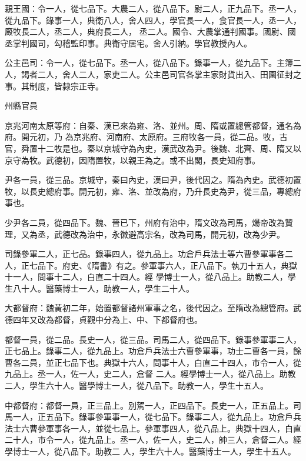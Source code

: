 \begin{pinyinscope}
 親王國：令一人，從七品下。大農二人，從八品下。尉二人，正九品下。丞一人，從九品下。錄事一人，典衛八人，舍人四人，學官長一人，食官長一人，丞一人，廄牧長二人，丞二人，典府長二人，
 丞二人。國令、大農掌通判國事。國尉、國丞掌判國司，勾稽監印事。典衛守居宅。舍人引納。學官教授內人。



 公主邑司：令一人，從七品下。丞一人，從八品下。錄事一人，從九品下。主簿二人，謁者二人，舍人二人，家吏二人。公主邑司官各掌主家財貨出入、田園征封之事。其制度，皆隸宗正寺。



 州縣官員



 京兆河南太原等府：自秦、漢已來為雍、洛、並州。周、隋或置總管都督，通名為府。開元初，乃
 為京兆府、河南府、太原府。三府牧各一員，從二品。牧，古官，舜置十二牧是也。秦以京城守為內史，漢武改為尹。後魏、北齊、周、隋又以京守為牧。武德初，因隋置牧，以親王為之。或不出閣，長史知府事。



 尹各一員，從三品。京城守，秦曰內史，漢曰尹，後代因之。隋為內史。武德初置牧，以長史總府事。開元初，雍、洛、並改為府，乃升長史為尹，從三品，專總府事也。



 少尹各二員，從四品下。魏、晉已下，州府有治中，隋文改為司馬，煬帝改為贊理，又為丞，武德改為治中，永徽避高宗名，改為司馬，開元初，改為少尹。



 司錄參軍二人，正七品。錄事四人，從九品上。功倉戶兵法士等六曹參軍事各二人，正七品下。府史、《隋書》有之。參軍事六人，正八品下。執刀十五人，典獄十一人，問事十二人，白直二十四人。經
 學博士一人，從八品上。助教二人，學生八十人。醫藥博士一人，助教一人，學生二十人。



 大都督府：魏黃初二年，始置都督諸州軍事之名，後代因之。至隋改為總管府。武德四年又改為都督，貞觀中分為上、中、下都督府也。



 都督一員，從二品。長史一人，從三品。司馬二人，從四品下。錄事參軍事二人，正七品上。錄事二人，從九品上。功倉戶兵法士六曹參軍事，功士二曹各一員，餘曹各二員，並正七品下也。典獄十六人，問事十人，白直二十四人，市令一人，從九品上。丞一人，佐一人，史二人，倉督
 二人。經學博士一人，從八品上。助教二人，學生六十人。醫學博士一人，從八品下。助教一人，學生十五人。



 中都督府：都督一員，正三品上。別駕一人，正四品下。長史一人，正五品上。司馬一人，正五品下。錄事參軍事一人，從七品下。錄事二人，從九品上。功倉戶兵法士六曹參軍事各一人，並從七品上。參軍事四人，從八品上。典獄十四人，白直二十人，市令一人，從九品上。丞一人，佐一人，史二人，帥三人，倉督二人。經學博士一人，從八品下。助教二
 人，學生六十人。醫藥博士一人，學生十五人。




\end{pinyinscope}
